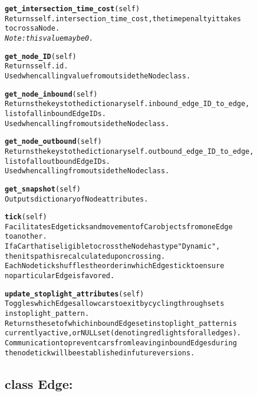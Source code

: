 \begin{alltt}
\textbf{get_intersection_time_cost}(self)
Returns self.intersection_time_cost, the time penalty it takes 
to cross a Node.
\textit{Note:  this value may be 0.}

\textbf{get_node_ID}(self)
Returns self.id.
Used when calling value from outside the Node class.

\textbf{get_node_inbound}(self)
Returns the keys to the dictionary self.inbound_edge_ID_to_edge, 
list of all inbound Edge IDs.
Used when calling from outside the Node class.

\textbf{get_node_outbound}(self)
Returns the keys to the dictionary self.outbound_edge_ID_to_edge, 
list of all outbound Edge IDs.
Used when calling from outside the Node class.

\textbf{get_snapshot}(self)
Outputs dictionary of Node attributes.

\textbf{tick}(self)
Facilitates Edge ticks and movement of Car objects from one Edge 
to another.
If a Car that is eligible to cross the Node has type "Dynamic", 
then its path is recalculated upon crossing.
Each Node tick shuffles the order in which Edges tick to ensure 
no particular Edge is favored.

\textbf{update_stoplight_attributes}(self)
Toggles which Edges allow cars to exit by cycling through sets 
in stoplight_pattern.
Returns the set of which inbound Edge set in stoplight_pattern is
currently active, or NULL set (denoting red lights for all edges).
Communication to prevent cars from leaving inbound Edges during 
the node tick will be established in future versions.

\end{alltt}

\subsection{class Edge:}

